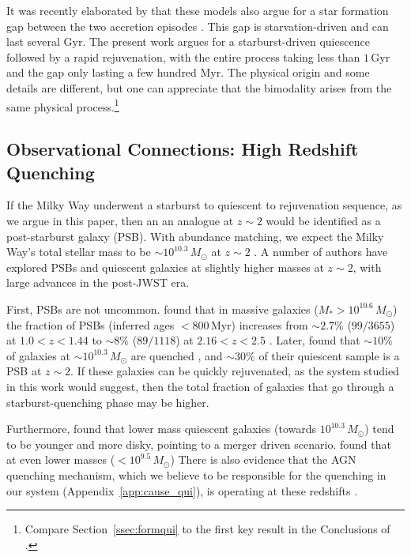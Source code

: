 \documentclass[linenumbers, twocolumn]{aastex631}
\newcommand{\Msun}{\ensuremath{M_{\odot}}}
\newcommand{\Gyr}{\ensuremath{\textrm{Gyr}}}
\newcommand{\Myr}{\ensuremath{\textrm{Myr}}}
\begin{document}
It was recently elaborated by \citet{2024arXiv240511025S} that these models also argue for a star formation gap between the two accretion episodes \citep[see also][]{1996ASPC...92..307G,1998A&A...338..161F,2000A&A...358..671G,2015A&A...578A..87S,2020A&A...640A..81N}. This gap is starvation-driven and can last several \Gyr{}. The present work argues for a starburst-driven quiescence followed by a rapid rejuvenation, with the entire process taking less than $1\,\Gyr$ and the gap only lasting a few hundred \Myr{}. The physical origin and some details are different, but one can appreciate that the bimodality arises from the same physical process.\footnote{Compare Section~\ref{ssec:formqui} to the first key result in the Conclusions of \citet{2024arXiv240511025S}.}

\subsection{Observational Connections: High Redshift Quenching}\label{ssec:obshiz}
If the Milky Way underwent a starburst to quiescent to rejuvenation sequence, as we argue in this paper, then an an analogue at $z\sim2$ would be identified as a post-starburst galaxy (PSB). With abundance matching, we expect the Milky Way's total stellar mass to be $\sim10^{10.3}\,\Msun$ at $z\sim2$ \citep{2013ApJ...771L..35V}. A number of authors have explored PSBs and quiescent galaxies at slightly higher masses at $z\sim2$, with large advances in the post-JWST era.

First, PSBs are not uncommon. \citet{2023ApJ...953..119P} found that in massive galaxies ($M_* > 10^{10.6}\,\Msun$) the fraction of PSBs (inferred ages $< 800\,\Myr$) increases from $\sim2.7\%$ ($99/3655$) at $1.0 < z < 1.44$ to $\sim8\%$ ($89/1118$) at $2.16 < z < 2.5$ \citep[see also][]{2012ApJ...745..179W,2019ApJ...874...17B}. Later, \citet{2024arXiv240417945P} found that $\sim10\%$ of galaxies at $\sim10^{10.3}\,\Msun$ are quenched \citep[consistent with][]{2013ApJ...777...18M}, and $\sim30\%$ of their quiescent sample is a PSB at $z\sim2$. If these galaxies can be quickly rejuvenated, as the system studied in this work would suggest, then the total fraction of galaxies that go through a starburst-quenching phase may be higher.

Furthermore, \citet{2023arXiv231215012C} found that lower mass quiescent galaxies (towards $10^{10.3}\,\Msun$) tend to be younger and more disky, pointing to a merger driven scenario. \citet{2023arXiv231212207A} found that at even lower masses ($<10^{9.5}\,\Msun$) There is also evidence that the AGN quenching mechanism, which we believe to be responsible for the quenching in our system (Appendix~\ref{app:cause_qui}), is operating at these redshifts \citep[e.g.][and references therein]{2023arXiv230806317D,2024arXiv240417945P,2024arXiv240518685M,2024Natur.630...54B}.
\end{document}
